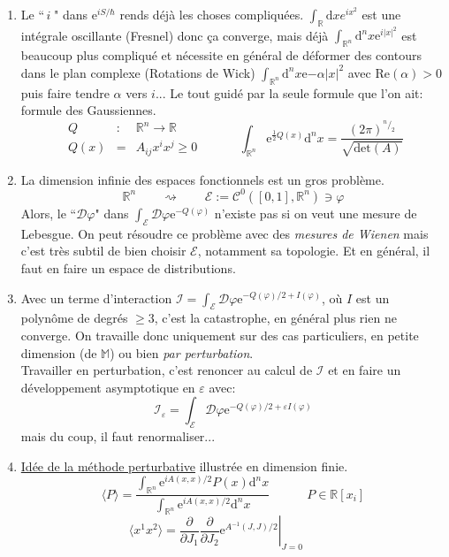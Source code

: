 \documentclass[a4paper,11pt]{article}
\renewcommand{\d}{{\mathrm{d}}}
\newcommand{\D}{{\mathcal{D}}}
\newcommand{\e}{{\mathrm{e}}}
\newcommand{\dr}[2]{\frac{\partial {#1}}{\partial{#2}}}
\begin{document}
\begin{enumerate}
\item Le ``$\,i\;$" dans $\e^{iS/\hbar}$ rends déjà les choses compliquées. $\int_\mathbb{R}\d x e^{ix^2}$ est une intégrale oscillante (Fresnel) donc ça converge, mais déjà $\int_{\mathbb{R}^n} \d^nx \e^{i|x|^2}$ est beaucoup plus compliqué et nécessite en général de déformer des contours dans le plan complexe (Rotations de Wick) $\int_{\mathbb{R}^n}\d^nx\e{-\alpha|x|^2}$ avec $\mathrm{Re}(\alpha)>0$ puis faire tendre $\alpha$ vers $i$... Le tout guidé par la seule formule que l'on ait: formule des Gaussiennes.
$$\begin{matrix}
Q & : & \mathbb{R}^n\to \mathbb{R}\\
Q(x) & = & A_{ij}x^ix^j\geq 0
\end{matrix}
\quad \quad \quad
\int_{\mathbb{R}^n}\e^{\frac{1}{2}Q(x)} \d^n x = \frac{(2\pi)^{^n\!/_{\!2}}}{\sqrt{\mathrm{det}(A)}}
$$
\item La dimension infinie des espaces fonctionnels est un gros problème.
$$\mathbb{R}^n \quad \quad \rightsquigarrow \quad \quad \mathcal{E}:= \mathcal{C}^0([0,1],\mathbb{R}^n) \ni \varphi$$
Alors, le ``$\D\varphi$" dans $\int_\mathcal{E}\D\varphi \e^{-Q(\varphi)}$ n'existe pas si on veut une mesure de Lebesgue. On peut résoudre ce problème avec des \emph{mesures de Wienen} mais c'est très subtil de bien choisir $\mathcal{E}$, notamment sa topologie. Et en général, il faut en faire un espace de distributions.
\item Avec un terme d'interaction $\mathcal{I}=\int_\mathcal{E}\D\varphi\e^{-Q(\varphi)/2+I(\varphi)}$, où $I$ est un polynôme de degrés $\geq 3$, c'est la catastrophe, en général plus rien ne converge. On travaille donc uniquement sur des cas particuliers, en petite dimension (de $\mathbb{M}$) ou bien \emph{par perturbation}.\\
Travailler en perturbation, c'est renoncer au calcul de $\mathcal{I}$ et en faire un développement asymptotique en $\varepsilon$ avec:
$$\mathcal{I}_\varepsilon = \int_\mathcal{E}\D\varphi\e^{-Q(\varphi)/2+\varepsilon I(\varphi)}$$
mais du coup, il faut renormaliser...
\item \underline{Idée de la méthode perturbative} illustrée en dimension finie.
$$\langle P \rangle = \frac{
\int_{\mathbb{R}^n} \e^{iA(x,x)/2}P(x)\d^n x
}{
\int_{\mathbb{R}^n} \e^{iA(x,x)/2}\d^n x
} \quad \quad \quad P \in \mathbb{R}[x_i]$$
$$\langle x^1x^2\rangle = \left.\dr{}{J_1}\dr{}{J_2} \e^{A^{-1}(J,J)/2}\right|_{J=0} \quad \quad
\begin{matrix}

\end{matrix}$$
\end{enumerate}
\end{document}
